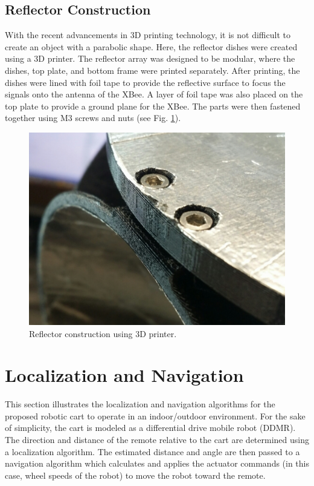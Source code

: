 \documentclass[conference]{IEEEtran}
\begin{document}
\subsection{Reflector Construction}
With the recent advancements in 3D printing technology, it is not difficult to
create an object with a parabolic shape. Here, the reflector dishes
were created using a 3D printer. The reflector array was designed to be modular,
where the dishes, top plate, and bottom frame were printed separately. After
printing, the dishes were lined with foil tape to provide the reflective surface
to focus the signals onto the antenna of the XBee. A layer of foil tape was also
placed on the top plate to provide a ground plane for the XBee. The parts were
then fastened together using M3 screws and nuts (see Fig.
\ref{fig:reflectorConstruction}).
%
\begin{figure}[htbp]
    \centering
    \includegraphics[scale=0.1]{figs/img/reflectorConstruction.jpg}
    \caption{Reflector construction using 3D printer.}
    \label{fig:reflectorConstruction}
\end{figure}
%


\section{Localization and Navigation}
\label{sec:locAndNavAlgos}

This section illustrates the localization and navigation algorithms for the
proposed robotic cart to operate in an indoor/outdoor environment. For the sake
of simplicity, the cart is modeled as a differential drive mobile robot (DDMR).
The direction and distance of the remote relative to the cart are determined
using a localization algorithm. The estimated distance and angle are then passed
to a navigation algorithm which calculates and applies the actuator commands
(in this case, wheel speeds of the robot) to move the robot toward the remote.
\end{document}
